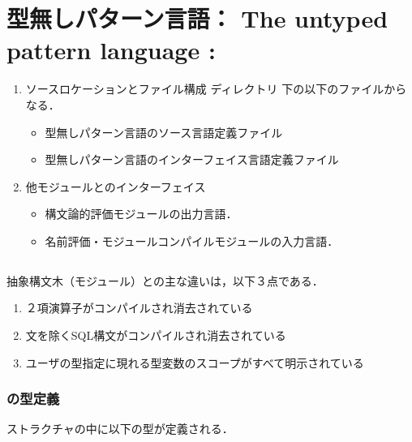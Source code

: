 \chapter{\txt
{型無しパターン言語：}
{The untyped pattern language : }
}
\label{chap:PatternCalc}

\ifjp%
\begin{enumerate}
\item ソースロケーションとファイル構成
ディレクトリ 下の以下のファイルからなる．
\begin{itemize}
\item {} 型無しパターン言語のソース言語定義ファイル
\item {} 型無しパターン言語のインターフェイス言語定義ファイル
\end{itemize}

\item 他モジュールとのインターフェイス
\begin{itemize}
\item 構文論的評価モジュールの出力言語．
\item 名前評価・モジュールコンパイルモジュールの入力言語．
\end{itemize}
\end{enumerate}
\else%
\fi%

\section{}
\ifjp%
	抽象構文木（モジュール）との主な違いは，以下３点である．
\begin{enumerate}
\item ２項演算子がコンパイルされ消去されている
\item {}文を除くSQL構文がコンパイルされ消去されている
\item ユーザの型指定に現れる型変数のスコープがすべて明示されている
\end{enumerate}

\subsection{の型定義}
	ストラクチャの中に以下の型が定義される．

